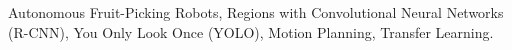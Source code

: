 \documentclass[a4paper,fleqn]{cas-dc}
\begin{document}









\begin{keywords}
 Autonomous Fruit-Picking Robots,
Regions with Convolutional Neural Networks (R-CNN),
You Only Look Once (YOLO),
Motion Planning,
Transfer Learning.
\end{keywords}

\maketitle
\end{document}
